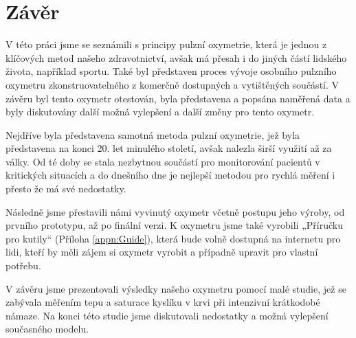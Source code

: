 \newpage
\part{Závěr}
V této práci jsme se seznámili s principy pulzní oxymetrie, která je jednou z klíčových metod našeho zdravotnictví, avšak má přesah i do jiných částí lidského života, například sportu. Také byl představen proces vývoje osobního pulzního oxymetru zkonstruovatelného z komerčně dostupných a vytištěných součástí. V závěru byl tento oxymetr otestován, byla představena a popsána naměřená data a byly diskutovány další možná vylepšení a další změny pro tento oxymetr.
\par Nejdříve byla představena samotná metoda pulzní oxymetrie, jež byla představena na konci 20. let minulého století, avšak nalezla širší využití až za války. Od té doby se stala nezbytnou součástí pro monitorování pacientů v kritických situacích a do dnešního dne je nejlepší metodou pro rychlá měření i přesto že má své nedostatky.
\par Následně jsme přestavili námi vyvinutý oxymetr včetně postupu jeho výroby, od prvního prototypu, až po finální verzi. K oxymetru jsme také vyrobili „Příručku pro kutily“ (Příloha \ref{appn:Guide}), která bude volně dostupná na internetu pro lidi, kteří by měli zájem si oxymetr vyrobit a případně upravit pro vlastní potřebu.
\par V závěru jsme prezentovali výsledky našeho oxymetru pomocí malé studie, jež se zabývala měřením tepu a saturace kyslíku v krvi při intenzivní krátkodobé námaze. Na konci této studie jsme diskutovali nedostatky a možná vylepšení současného modelu.